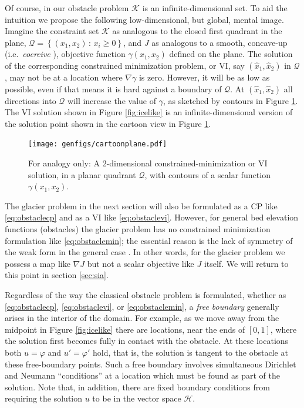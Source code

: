 \documentclass[letterpaper,final,12pt,reqno]{amsart}
\newcommand{\grad}{\nabla}
\numberwithin{equation}{section}
\numberwithin{figure}{section}
\numberwithin{table}{section}
\begin{document}
Of course, in our obstacle problem $\mathcal{K}$ is an infinite-dimensional set.  To aid the intuition we propose the following low-dimensional, but global, mental image.  Imagine the constraint set $\mathcal{K}$ as analogous to the closed first quadrant in the plane, $\mathcal{Q} = \left\{(x_1,x_2)\,:\,x_i\ge 0\right\}$, and $J$ as analogous to a smooth, concave-up (i.e.~\emph{coercive} \cite{Evans2010}), objective function $\gamma(x_1,x_2)$ defined on the plane.  The solution of the corresponding constrained minimization problem, or VI, say $(\hat x_1,\hat x_2)$ in $\mathcal{Q}$, may not be at a location where $\nabla \gamma$ is zero.  However, it will be as low as possible, even if that means it is hard against a boundary of $\mathcal{Q}$.  At $(\hat x_1,\hat x_2)$ all directions into $\mathcal{Q}$ will increase the value of $\gamma$, as sketched by contours in Figure \ref{fig:cartoonplane}.  The VI solution shown in Figure \ref{fig:icelike} is an infinite-dimensional version of the solution point shown in the cartoon view in Figure \ref{fig:cartoonplane}.

\begin{figure}
\texttt{[image: genfigs/cartoonplane.pdf]}
\caption{For analogy only:  A 2-dimensional constrained-minimization or VI solution, in a planar quadrant $\mathcal{Q}$, with contours of a scalar function $\gamma(x_1,x_2)$.}
\label{fig:cartoonplane}
\end{figure}

The glacier problem in the next section will also be formulated as a CP like \eqref{eq:obstaclecp} and as a VI like \eqref{eq:obstaclevi}.  However, for general bed elevation functions (obstacles) the glacier problem has no constrained minimization formulation like \eqref{eq:obstaclemin}; the essential reason is the lack of symmetry of the weak form in the general case \cite{JouvetBueler2012}.  In other words, for the glacier problem we possess a map like $\grad J$ but not a scalar objective like $J$ itself.  We will return to this point in section \ref{sec:sia}.

Regardless of the way the classical obstacle problem is formulated, whether as \eqref{eq:obstaclecp}, \eqref{eq:obstaclevi}, or \eqref{eq:obstaclemin}, a \emph{free boundary} generally arises in the interior of the domain.  For example, as we move away from the midpoint in Figure \ref{fig:icelike} there are locations, near the ends of $[0,1]$, where the solution first becomes fully in contact with the obstacle.  At these locations both $u=\varphi$ and $u'=\varphi'$ hold, that is, the solution is tangent to the obstacle at these free-boundary points.  Such a free boundary involves simultaneous Dirichlet and Neumann ``conditions'' at a location which must be found as part of the solution.  Note that, in addition, there are fixed boundary conditions from requiring the solution $u$ to be in the vector space $\mathcal{H}$.
\end{document}
